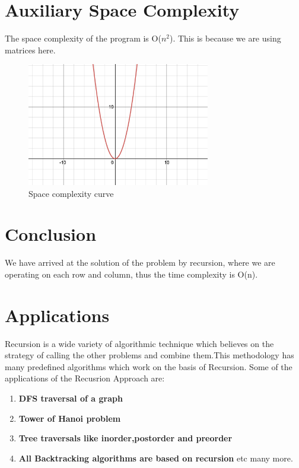\documentclass[conference]{IEEEtran}
\begin{document}
\section{\textbf {Auxiliary Space Complexity}}
\noindent The space complexity of the program is O({$n^2$}). This is because we are using matrices here.

\begin{figure}[htp]
    \centering
    \includegraphics[width=8cm]{spacecomplexity}
    \caption{Space complexity curve}
    \label{fig:spacecomplexity.png}
\end{figure}

\section{\textbf {Conclusion}} \noindent We have arrived at the solution of the problem by recursion, where we are operating on each row and column, thus the time complexity is O(n).\\

\section{Applications}
Recursion is a wide variety of algorithmic technique which believes on the strategy of calling the other problems and combine them.This methodology has many predefined algorithms which work on the basis of Recursion. Some of the applications of the Recusrion Approach are:

\begin{enumerate}
\item \textbf{DFS traversal of a graph}
\item \textbf{Tower of Hanoi problem}
\item \textbf{Tree traversals like inorder,postorder and preorder} 
\item \textbf{ All Backtracking algorithms are based on recursion} etc many more.

\end{enumerate}
\end{document}

